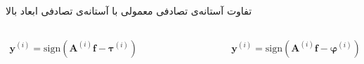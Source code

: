 \begin{frame}
\begin{block}{}
\begin{center}
تفاوت آستانه‌ی تصادفی معمولی با آستانه‌ی تصادفی ابعاد بالا
\end{center}
\end{block}
\begin{columns}
\begin{align*}
 \bm{y}^{\left(i\right)} = \text{sign}\left(\bm{A}^{(i)}\bm{f}-\bm{\tau}^{\left(i\right)}\right)
\end{align*}
\begin{figure}
\centering
\includegraphics[scale=0.3]{Images/HDT1.png}
\end{figure}
\begin{align*}
 \bm{y}^{\left(i\right)} = \text{sign}\left(\bm{A}^{(i)}\bm{f}-\bm{\varphi}^{\left(i\right)}\right)
\end{align*}
\begin{figure}
\centering
\includegraphics[scale=0.3]{Images/HDT2.png}
\end{figure}
\end{columns}
\end{frame}
